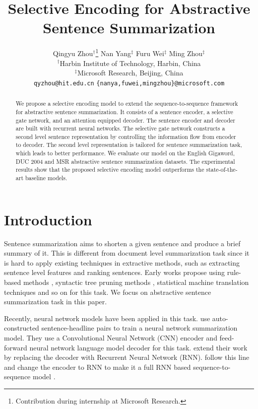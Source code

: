 \documentclass[11pt,a4paper]{article}
\title{Selective Encoding for Abstractive Sentence Summarization}
\author{Qingyu Zhou$^\dag$\thanks{\; Contribution during internship at Microsoft Research.} \hspace{0.15cm} Nan Yang$^\ddag$ \hspace{0.15cm} Furu Wei$^\ddag$ \hspace{0.15cm}  Ming Zhou$^\ddag$ \\
	$^\dag$Harbin Institute of Technology, Harbin, China \\
	$^\ddag$Microsoft Research, Beijing, China \\
	{\tt qyzhou@hit.edu.cn} \hspace{0.25cm} {\tt \{nanya,fuwei,mingzhou\}@microsoft.com}
}
\date{}
\begin{document}
\maketitle
\begin{abstract}
	We propose a selective encoding model to extend the sequence-to-sequence framework for abstractive sentence summarization.
	It consists of a sentence encoder, a selective gate network, and an attention equipped decoder.
	The sentence encoder and decoder are built with recurrent neural networks.
	The selective gate network constructs a second level sentence representation by controlling the information flow from encoder to decoder.
	The second level representation is tailored for sentence summarization task, which leads to better performance.
	We evaluate our model on the English Gigaword, DUC 2004 and MSR abstractive sentence summarization datasets.
	The experimental results show that the proposed selective encoding model outperforms the state-of-the-art baseline models.
\end{abstract}

\section{Introduction}

Sentence summarization aims to shorten a given sentence and produce a brief summary of it.
This is different from document level summarization task since it is hard to apply existing techniques in extractive methods, such as extracting sentence level features and ranking sentences.
Early works propose using rule-based methods \citep{zajic2007multi}, syntactic tree pruning methods \citep{knight2002summarization}, statistical machine translation techniques \citep{banko2000headline} and so on for this task.
We focus on abstractive sentence summarization task in this paper.



Recently, neural network models have been applied in this task.
\citet{rush-chopra-weston:2015:EMNLP} use auto-constructed sentence-headline pairs to train a neural network summarization model.
They use a Convolutional Neural Network (CNN) encoder and feed-forward neural network language model decoder for this task.
\citet{chopra-auli-rush:2016:N16-1} extend their work by replacing the decoder with Recurrent Neural Network (RNN).
\citet{nallapatiabstractive} follow this line and change the encoder to RNN to make it a full RNN based sequence-to-sequence model \citep{sutskever2014sequence}.
\end{document}
